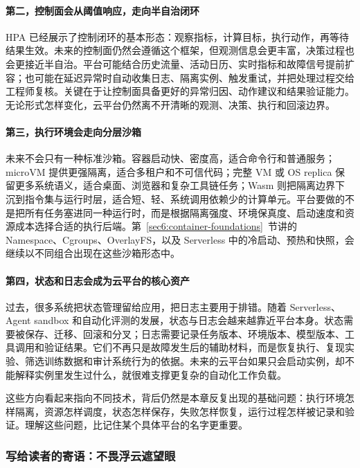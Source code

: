 \paragraph{第二，控制面会从阈值响应，走向半自治闭环}
HPA 已经展示了控制闭环的基本形态：观察指标，计算目标，执行动作，再等待结果生效。未来的控制面仍然会遵循这个框架，但观测信息会更丰富，决策过程也会更接近半自治。平台可能结合历史流量、活动日历、实时指标和故障信号提前扩容；也可能在延迟异常时自动收集日志、隔离实例、触发重试，并把处理过程交给工程师复核。关键在于让控制面具备更好的异常归因、动作建议和结果验证能力。无论形式怎样变化，云平台仍然离不开清晰的观测、决策、执行和回滚边界。

\paragraph{第三，执行环境会走向分层沙箱}
未来不会只有一种标准沙箱。容器启动快、密度高，适合命令行和普通服务；microVM 提供更强隔离，适合多租户和不可信代码；完整 VM 或 OS replica 保留更多系统语义，适合桌面、浏览器和复杂工具链任务；Wasm 则把隔离边界下沉到指令集与运行时层，适合短、轻、系统调用依赖少的计算单元。平台要做的不是把所有任务塞进同一种运行时，而是根据隔离强度、环境保真度、启动速度和资源成本选择合适的执行后端。第~\ref{sec6:container-foundations}~节讲的 Namespace、Cgroups、OverlayFS，以及 Serverless 中的冷启动、预热和快照，会继续以不同组合出现在这些沙箱形态中。

\paragraph{第四，状态和日志会成为云平台的核心资产}
过去，很多系统把状态管理留给应用，把日志主要用于排错。随着 Serverless、Agent sandbox 和自动化评测的发展，状态与日志会越来越靠近平台本身。状态需要被保存、迁移、回滚和分叉；日志需要记录任务版本、环境版本、模型版本、工具调用和验证结果。它们不再只是故障发生后的辅助材料，而是恢复执行、复现实验、筛选训练数据和审计系统行为的依据。未来的云平台如果只会启动实例，却不能解释实例里发生过什么，就很难支撑更复杂的自动化工作负载。

这些方向看起来指向不同技术，背后仍然是本章反复出现的基础问题：执行环境怎样隔离，资源怎样调度，状态怎样保存，失败怎样恢复，运行过程怎样被记录和验证。理解这些问题，比记住某个具体平台的名字更重要。

\subsubsection{写给读者的寄语：不畏浮云遮望眼}
\label{sec6:reader-note}


